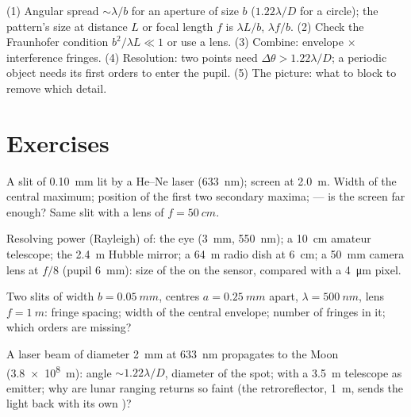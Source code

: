 \begin{method}\label{met:b2:diffraction:method}
(1) Angular spread $\sim\lambda/b$ for an aperture of size $b$ ($1.22\lambda/D$ for
a circle); the pattern's size at distance $L$ or focal length $f$ is
$\lambda L/b$, $\lambda f/b$. (2) Check the Fraunhofer condition $b^2/\lambda L \ll 1$ or
use a lens. (3) Combine:  envelope $\times$ interference
fringes. (4) Resolution: two points need $\Delta\theta > 1.22\lambda/D$; a periodic
object needs its first orders to enter the pupil. (5) The  picture: what to block to remove which detail.
\end{method}

\section{Exercises}

\begin{exercise}[$\star$]\label{exo:b2:diffraction:1}
A slit of \qty{0.10}{mm} lit by a He--Ne laser (\qty{633}{nm}); screen at
\qty{2.0}{m}. Width of the central maximum; position of the first two
secondary maxima;  --- is the screen far enough? Same
slit with a lens of $f = \qty{50}{cm}$.
\end{exercise}

\begin{exercise}[$\star$]\label{exo:b2:diffraction:2}
Resolving power (Rayleigh) of: the eye (\qty{3}{mm}, \qty{550}{nm}); a
\qty{10}{cm} amateur telescope; the \qty{2.4}{m} Hubble mirror; a \qty{64}{m}
radio dish at \qty{6}{cm}; a \qty{50}{mm} camera lens at $f/8$ (pupil \qty{6}{mm}):
size of the  on the sensor, compared with a \qty{4}{\micro m} pixel.
\end{exercise}

\begin{exercise}[$\star$]\label{exo:b2:diffraction:3}
Two slits of width $b = \qty{0.05}{mm}$, centres $a = \qty{0.25}{mm}$ apart, $\lambda =
\qty{500}{nm}$, lens $f = \qty{1}{m}$: fringe spacing; width of the central
envelope; number of fringes in it; which orders are missing?
\end{exercise}

\begin{exercise}[$\star$]\label{exo:b2:diffraction:4}
A laser beam of diameter \qty{2}{mm} at \qty{633}{nm} propagates to the Moon
(\qty{3.8e8}{m}):  angle $\sim1.22\lambda/D$, diameter of the spot;
with a \qty{3.5}{m} telescope as emitter; why are lunar ranging returns so
faint (the retroreflector, \qty{1}{m}, sends the light back with its own
)?
\end{exercise}


